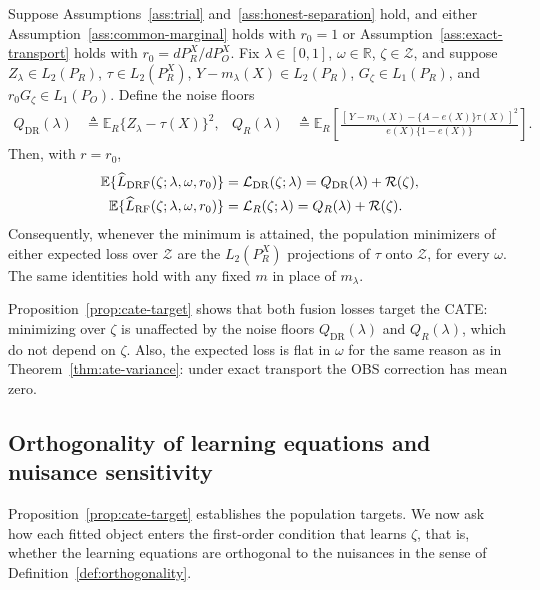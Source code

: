 \begin{proposition}
\label{prop:cate-target}
Suppose Assumptions~\ref{ass:trial} and~\ref{ass:honest-separation} hold, and either Assumption~\ref{ass:common-marginal} holds with $r_0=1$ or Assumption~\ref{ass:exact-transport} holds with $r_0=dP_R^X/dP_O^X$. Fix $\lambda\in[0,1]$, $\omega\in\mathbb R$, $\zeta\in\mathcal Z$, and suppose $Z_\lambda\in L_2(P_R)$, $\tau\in L_2(P_R^X)$, $Y-m_\lambda(X)\in L_2(P_R)$, $G_\zeta\in L_1(P_R)$, and $r_0G_\zeta\in L_1(P_O)$. Define the noise floors
\begin{align*}
Q_{\mathrm{DR}}(\lambda)&\triangleq\mathbb E_R\{Z_\lambda-\tau(X)\}^2,
&
Q_R(\lambda)&\triangleq\mathbb E_R\left[\frac{[\,Y-m_\lambda(X)-\{A-e(X)\}\tau(X)\,]^2}{e(X)\{1-e(X)\}}\right].
\end{align*}
Then, with $r=r_0$,
\begin{align}
\mathbb E\{\widehat L_{\mathrm{DRF}}(\zeta;\lambda,\omega,r_0)\}&=\mathcal L_{\mathrm{DR}}(\zeta;\lambda)=Q_{\mathrm{DR}}(\lambda)+\mathcal R(\zeta),
\notag\\
\mathbb E\{\widehat L_{\mathrm{RF}}(\zeta;\lambda,\omega,r_0)\}&=\mathcal L_R(\zeta;\lambda)=Q_R(\lambda)+\mathcal R(\zeta).
\label{eq:cate-target}
\end{align}
Consequently, whenever the minimum is attained, the population minimizers of either expected loss over $\mathcal Z$ are the $L_2(P_R^X)$ projections of $\tau$ onto $\mathcal Z$, for every $\omega$. The same identities hold with any fixed $m$ in place of $m_\lambda$.
\end{proposition}
Proposition~\ref{prop:cate-target} shows that both fusion losses target the CATE: minimizing over $\zeta$ is unaffected by the noise floors $Q_{\mathrm{DR}}(\lambda)$ and $Q_R(\lambda)$, which do not depend on $\zeta$.  Also, the expected loss is flat in $\omega$ for the same reason as in Theorem~\ref{thm:ate-variance}: under exact transport the OBS correction has mean zero. 
\subsection{Orthogonality of learning equations and nuisance sensitivity}
\label{sec:cate-orthogonality}


Proposition~\ref{prop:cate-target} establishes the population targets. We now ask how each fitted object enters the first-order condition that learns $\zeta$, that is, whether the learning equations are orthogonal to the nuisances in the sense of Definition~\ref{def:orthogonality}.

